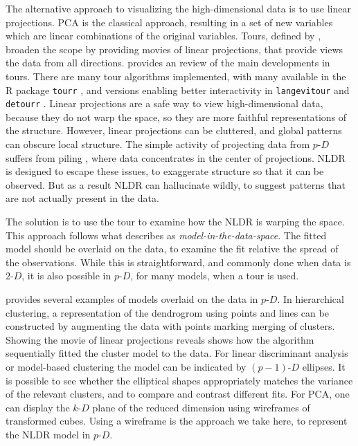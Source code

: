 \documentclass[
  12pt]{article}
\newcommand\pD{$p\text{-}D$}
\newcommand\kD{$k\text{-}D$}
\newcommand\gD{$2\text{-}D$}
\begin{document}
The alternative approach to visualizing the high-dimensional data is to
use linear projections. PCA is the classical approach, resulting in a
set of new variables which are linear combinations of the original
variables. Tours, defined by \citet{lee2021}, broaden the scope by
providing movies of linear projections, that provide views the data from
all directions. \citet{lee2021} provides an review of the main
developments in tours. There are many tour algorithms implemented, with
many available in the R package \texttt{tourr} \citep{wickham2011}, and
versions enabling better interactivity in \texttt{langevitour}
\citep{harisson2024} and \texttt{detourr} \citep{hart2022}. Linear
projections are a safe way to view high-dimensional data, because they
do not warp the space, so they are more faithful representations of the
structure. However, linear projections can be cluttered, and global
patterns can obscure local structure. The simple activity of projecting
data from \pD{} suffers from piling \citep{laa2022}, where data
concentrates in the center of projections. NLDR is designed to escape
these issues, to exaggerate structure so that it can be observed. But as
a result NLDR can hallucinate wildly, to suggest patterns that are not
actually present in the data.

The solution is to use the tour to examine how the NLDR is warping the
space. This approach follows what \citet{wickham2015} describes as
\emph{model-in-the-data-space}. The fitted model should be overlaid on
the data, to examine the fit relative the spread of the observations.
While this is straightforward, and commonly done when data is \gD{}, it
is also possible in \pD{}, for many models, when a tour is used.

\citet{wickham2015} provides several examples of models overlaid on the
data in \pD{}. In hierarchical clustering, a representation of the
dendrogrom using points and lines can be constructed by augmenting the
data with points marking merging of clusters. Showing the movie of
linear projections reveals shows how the algorithm sequentially fitted
the cluster model to the data. For linear discriminant analysis or
model-based clustering the model can be indicated by \((p-1)\text{-}D\)
ellipses. It is possible to see whether the elliptical shapes
appropriately matches the variance of the relevant clusters, and to
compare and contrast different fits. For PCA, one can display the \kD{}
plane of the reduced dimension using wireframes of transformed cubes.
Using a wireframe is the approach we take here, to represent the NLDR
model in \pD{}.
\end{document}

